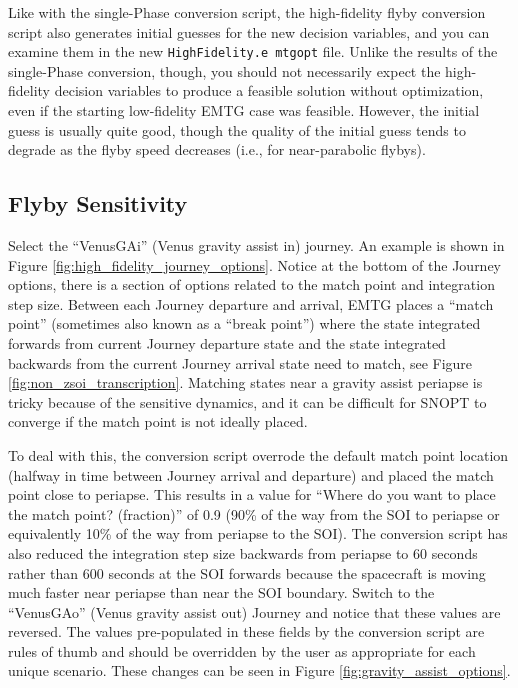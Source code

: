 \documentclass[11pt]{article}
\begin{document}
\noindent Like with the single-Phase conversion script, the high-fidelity flyby conversion script also generates initial guesses for the new decision variables, and you can examine them in the new \texttt{HighFidelity.e mtgopt} file. Unlike the results of the single-Phase conversion, though, you should not necessarily expect the high-fidelity decision variables to produce a feasible solution without optimization, even if the starting low-fidelity \ac{EMTG} case was feasible. However, the initial guess is usually quite good, though the quality of the initial guess tends to degrade as the flyby speed decreases (i.e., for near-parabolic flybys).


\subsection{Flyby Sensitivity}
\label{sec:flyby_sensitivity}

Select the ``VenusGAi'' (Venus gravity assist in) journey. An example is shown in Figure \ref{fig:high_fidelity_journey_options}. Notice at the bottom of the Journey options, there is a section of options related to the match point and integration step size. Between each Journey departure and arrival, \ac{EMTG} places a ``match point'' (sometimes also known as a ``break point'') where the state integrated forwards from current Journey departure state and the state integrated backwards from the current Journey arrival state need to match, see Figure \ref{fig:non_zsoi_transcription}. Matching states near a gravity assist periapse is tricky because of the sensitive dynamics, and it can be difficult for \acs{SNOPT} to converge if the match point is not ideally placed.

\noindent To deal with this, the conversion script overrode the default match point location (halfway in time between Journey arrival and departure) and placed the match point close to periapse. This results in a value for ``Where do you want to place the match point? (fraction)'' of 0.9 (90\% of the way from the SOI to periapse or equivalently 10\% of the way from periapse to the \acs{SOI}). The conversion script has also reduced the integration step size backwards from periapse to 60 seconds rather than 600 seconds at the \acs{SOI} forwards because the spacecraft is moving much faster near periapse than near the \acs{SOI} boundary. Switch to the ``VenusGAo'' (Venus gravity assist out) Journey and notice that these values are reversed. The values pre-populated in these fields by the conversion script are rules of thumb and should be overridden by the user as appropriate for each unique scenario. These changes can be seen in Figure \ref{fig:gravity_assist_options}.
\end{document}
